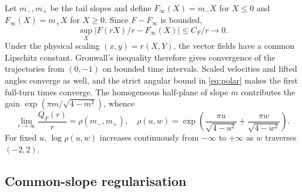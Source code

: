 \documentclass[11pt]{article}
\theoremstyle{remark}
\begin{document}
Let \(m_-,m_+\) be the tail slopes and define
\(F_\infty(X)=m_-X\) for \(X\le0\) and \(F_\infty(X)=m_+X\)
for \(X\ge0\).  Since \(F-F_\infty\) is bounded,
\[
 \sup_X|F(rX)/r-F_\infty(X)|\le C_F/r\longrightarrow0.
\]
Under the physical scaling \((x,y)=r(X,Y)\), the vector fields have a
common Lipschitz constant.  Gronwall's inequality therefore gives
convergence of the trajectories from \((0,-1)\) on bounded time
intervals.  Scaled velocities and lifted angles converge as well, and
the strict angular bound in \eqref{eq:polar} makes the first full-turn
times converge.  The homogeneous half-plane of slope \(m\) contributes
the gain \(\exp(\pi m/\sqrt{4-m^2})\), whence
\begin{equation}\label{eq:gain}
 \lim_{r\to\infty}\frac{Q_F(r)}r
 =\rho(m_-,m_+),\quad
 \rho(u,w)=\exp\!\left(\frac{\pi u}{\sqrt{4-u^2}}+
                         \frac{\pi w}{\sqrt{4-w^2}}\right).
\end{equation}
For fixed \(u\), \(\log\rho(u,w)\) increases continuously from
\(-\infty\) to \(+\infty\) as \(w\) traverses \((-2,2)\).

\subsection{Common-slope regularisation}
\end{document}
